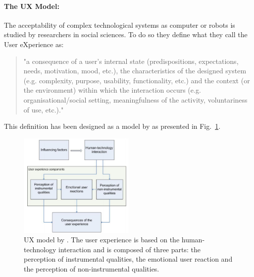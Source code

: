 \documentclass[english,a4paper,11pt,twoside]{StyleThese}
\begin{document}
\paragraph{The UX Model:}
The acceptability of complex technological systems as computer or robots is studied by researchers in social sciences. To do so they define what they call the User eXperience \cite{hassenzahl2006user} as:

\begin{quote}
"a consequence of a user's internal state (predispositions, expectations, needs, motivation, mood, etc.), the characteristics of the designed system (e.g. complexity, purpose, usability, functionality, etc.) and the context (or the environment) within which the interaction occurs (e.g. organisational/social setting, meaningfulness of the activity, voluntariness of use, etc.)."
\end{quote}

This definition has been designed as a model by \cite{mahlke2008user} as presented in Fig.~\ref{fig:modelUX}.

\begin{figure}[!h]
	\centering
    \includegraphics[width=0.50\textwidth]{figs/Chapter5/ModelUX.png}
    \caption{UX model by \cite{mahlke2008user}. The user experience is based on the human-technology interaction and is composed of three parts: the perception of instrumental qualities, the emotional user reaction and the perception of non-instrumental qualities.}
    \label{fig:modelUX}
\end{figure}
\end{document}
